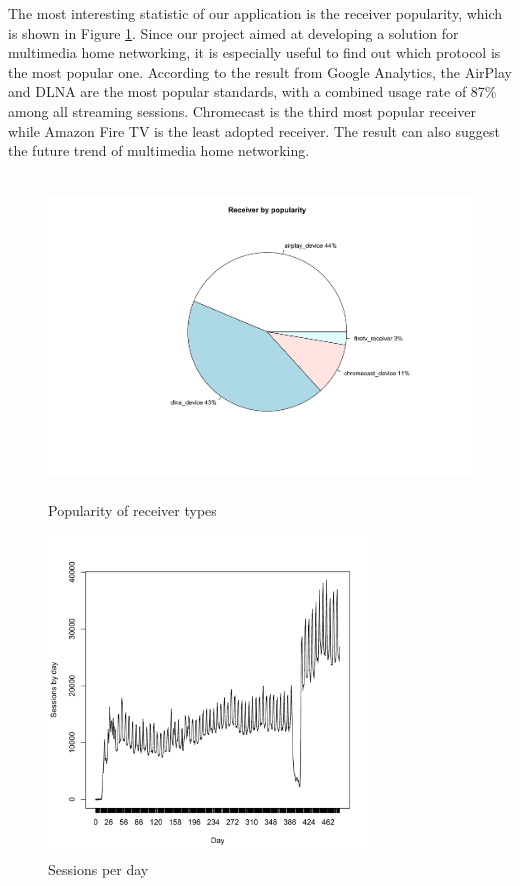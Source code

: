 The most interesting statistic of our application is the receiver popularity,
which is shown in Figure \ref{receiver_types}. Since our project aimed at
developing a solution for multimedia home networking, it is especially useful
to find out which protocol is the most popular one. According to the result
from Google Analytics, the AirPlay and DLNA are the most popular standards,
with a combined   usage rate of 87\% among all streaming sessions. Chromecast
is the third most popular receiver while Amazon Fire TV is the least adopted
receiver. The result can also suggest the future trend of multimedia home
networking.
\begin{figure}[htb]
\centering \includegraphics[height=8.5cm]{charts/receiver_popularity}
\caption{Popularity of receiver types \label{receiver_types}}
\end{figure}
\begin{figure}[hb]
\centering \includegraphics[height=8.5cm]{charts/sessions_per_day}
\caption{Sessions per day \label{sessions_perday}}
\end{figure}
